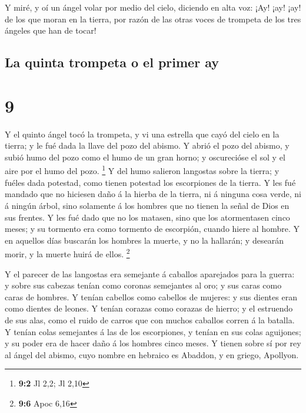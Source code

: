  Y miré, y oí un ángel volar por medio del cielo, diciendo
en alta voz: ¡Ay! ¡ay! ¡ay! de los que moran en la tierra, por razón de
las otras voces de trompeta de los tres ángeles que han de tocar!

\hypertarget{la-quinta-trompeta-o-el-primer-ay}{%
\subsection{La quinta trompeta o el primer
ay}\label{la-quinta-trompeta-o-el-primer-ay}}

\hypertarget{section-8}{%
\section{9}\label{section-8}}

 Y el quinto ángel tocó la trompeta, y vi una estrella que
cayó del cielo en la tierra; y le fué dada la llave del pozo del abismo.
 Y abrió el pozo del abismo, y subió humo del pozo como el
humo de un gran horno; y oscurecióse el sol y el aire por el humo del
pozo. \footnote{\textbf{9:2} Jl 2,2; Jl 2,10}  Y del humo
salieron langostas sobre la tierra; y fuéles dada potestad, como tienen
potestad los escorpiones de la tierra.  Y les fué mandado
que no hiciesen daño á la hierba de la tierra, ni á ninguna cosa verde,
ni á ningún árbol, sino solamente á los hombres que no tienen la señal
de Dios en sus frentes.  Y les fué dado que no los matasen,
sino que los atormentasen cinco meses; y su tormento era como tormento
de escorpión, cuando hiere al hombre.  Y en aquellos días
buscarán los hombres la muerte, y no la hallarán; y desearán morir, y la
muerte huirá de ellos. \footnote{\textbf{9:6} Apoc 6,16}

 Y el parecer de las langostas era semejante á caballos
aparejados para la guerra: y sobre sus cabezas tenían como coronas
semejantes al oro; y sus caras como caras de hombres.  Y
tenían cabellos como cabellos de mujeres: y sus dientes eran como
dientes de leones.  Y tenían corazas como corazas de hierro;
y el estruendo de sus alas, como el ruido de carros que con muchos
caballos corren á la batalla.  Y tenían colas semejantes á
las de los escorpiones, y tenían en sus colas aguijones; y su poder era
de hacer daño á los hombres cinco meses.  Y tienen sobre sí
por rey al ángel del abismo, cuyo nombre en hebraico es Abaddon, y en
griego, Apollyon.

